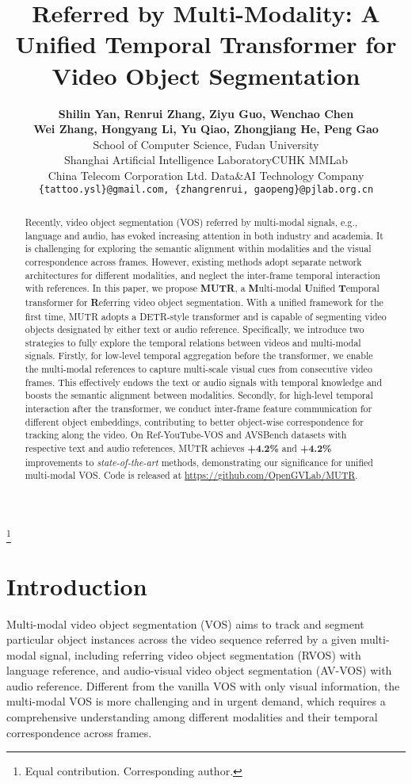 \documentclass{article}
\title{Referred by Multi-Modality: A Unified Temporal Transformer for Video Object Segmentation}
\author{\hspace{-0.25cm}\textbf{Shilin Yan, Renrui Zhang, Ziyu Guo, Wenchao Chen}\\ 
  \hspace{-0.25cm}\textbf{Wei Zhang, Hongyang Li, Yu Qiao, Zhongjiang He, Peng Gao}\vspace{0.3cm}\\
  \hspace{-0.25cm}School of Computer Science, Fudan University \\
  \hspace{-0.25cm}Shanghai Artificial Intelligence Laboratory\quad CUHK MMLab \\
  \hspace{-0.25cm}China Telecom Corporation Ltd. Data\&AI Technology Company\vspace{0.1cm}\\
  \texttt{\{tattoo.ysl\}@gmail.com, \{zhangrenrui, gaopeng\}@pjlab.org.cn} \\
}
\newcommand\blfootnote[1]{\begingroup
  \renewcommand\thefootnote{}\footnote{#1}\addtocounter{footnote}{-1}\endgroup
}
\begin{document}
\blfootnote{\noindent Equal contribution. 
 Corresponding author.}

\maketitle

\begin{abstract}

Recently, video object segmentation (VOS) referred by multi-modal signals, e.g., language and audio, has evoked increasing attention in both industry and academia. It is challenging for exploring the semantic alignment within modalities and the visual correspondence across frames.
However, existing methods adopt separate network architectures for different modalities, and neglect the inter-frame temporal interaction with references. In this paper, we propose \textbf{MUTR}, a \textbf{M}ulti-modal \textbf{U}nified \textbf{T}emporal transformer for \textbf{R}eferring video object segmentation. With a unified framework for the first time, MUTR adopts a DETR-style transformer and is capable of segmenting video objects designated by either text or audio reference. Specifically, we introduce two strategies to fully explore the temporal relations between videos and multi-modal signals. 
Firstly, for low-level temporal aggregation before the transformer, we enable the multi-modal references to capture multi-scale visual cues from consecutive video frames. This effectively endows the text or audio signals with temporal knowledge and boosts the semantic alignment between modalities.
Secondly, for high-level temporal interaction after the transformer, we conduct inter-frame feature communication for different object embeddings, contributing to better object-wise correspondence for tracking along the video.
On Ref-YouTube-VOS and AVSBench datasets with respective text and audio references, MUTR achieves \textbf{+4.2\%} and \textbf{+4.2\%}  improvements to \textit{state-of-the-art} methods, demonstrating our significance for unified multi-modal VOS. Code is released at \url{https://github.com/OpenGVLab/MUTR}.

\end{abstract}

\section{Introduction}\label{sec:introduction}
Multi-modal video object segmentation (VOS) aims to track and segment particular object instances across the video sequence referred by a given multi-modal signal, including referring video object segmentation (RVOS) with language reference, and audio-visual video object segmentation (AV-VOS) with audio reference.
Different from the vanilla VOS with only visual information, the multi-modal VOS is more challenging and in urgent demand, which requires a comprehensive understanding among different modalities and their temporal correspondence across frames.
\end{document}
